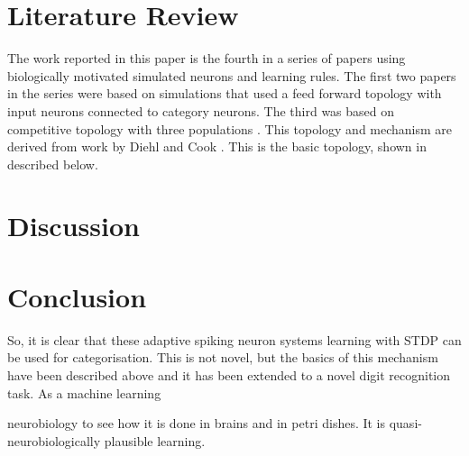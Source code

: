\documentclass[]{llncs}
\begin{document}
\section{Literature Review}
\label {secLitRev}

The work reported in this paper is the fourth in a series of papers
using biologically motivated simulated neurons and learning rules.
The first two papers in the series \cite {Huyck,Huyck-Samey} were
based on simulations that used a feed forward topology with input
neurons connected to category neurons.  The third was based on
competitive topology with three populations \cite
{HuyckErekpaine}. This topology and mechanism are derived from work by
Diehl and Cook \cite {Diehl}.  This is the basic topology, shown in
described below.


\section{Discussion}
\label {secDiscussion}

\section{Conclusion}

So, it is clear that these adaptive spiking neuron systems learning
with STDP can be used for categorisation.  This is not novel, but the
basics of this mechanism have been described above and it has been
extended to a novel digit recognition task. As a machine learning

neurobiology to see how it is done in brains and in petri dishes.  It
is quasi-neurobiologically plausible learning.




\end{document}
